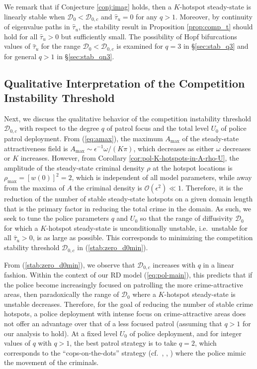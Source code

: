 \documentclass{article}%
\begin{document}
We remark that if Conjecture \ref{conj:imag} holds, then a $K$-hotspot
steady-state is linearly stable when ${\mathcal D}_0<{\mathcal
  D}_{0,c}$ and $\hat{\tau}_u=0$ for any $q>1$. Moreover, by
continuity of eigenvalue paths in $\hat{\tau}_u$, the stability result
in Proposition \ref{prop:comp_t} should hold for all $\hat{\tau}_u>0$
but sufficiently small. The possibility of Hopf bifurcations values of
$\hat{\tau}_u$ for the range ${\mathcal D}_0<{\mathcal D}_{0,c}$ is
examined for $q=3$ in \S \ref{sec:stab_q3} and for general $q>1$ in
\S \ref{sec:stab_qn3}.

\subsection{Qualitative Interpretation of the Competition Instability Threshold}\label{sec:qual_comp_d}

Next, we discuss the qualitative behavior of the competition
instability threshold ${\mathcal D}_{0,c}$ with respect to the degree
$q$ of patrol focus and the total level $U_0$ of police patrol
deployment.  From (\ref{eq:amax}), the maximum $A_{\max}$ of the
steady-state attractiveness field is $A_{\max}\sim
\epsilon^{-1}{\omega/(K\pi)}$, which decreases as either $\omega$
decreases or $K$ increases. However, from Corollary
\ref{cor:pol-K-hotspots-in-A-rho-U}, the amplitude of the steady-state
criminal density $\rho$ at the hotspot locations is
$\rho_{\max}=\left[w(0)\right]^2=2$, which is independent of all model
parameters, while away from the maxima of $A$ the criminal density is
${\mathcal O}(\epsilon^{2})\ll 1$. Therefore, it is the reduction of
the number of stable steady-state hotspots on a given domain length
that is the primary factor in reducing the total crime in the
domain. As such, we seek to tune the police parameters $q$ and $U_{0}$
so that the range of diffusivity ${\mathcal D}_{0}$ for which a
$K$-hotspot steady-state is unconditionally unstable, i.e.~unstable
for all $\hat{\tau}_u>0$, is as large as possible. This corresponds to
minimizing the competition stability threshold ${\mathcal D}_{0,c}$ in
(\ref{stab:zero_d0min}).

From (\ref{stab:zero_d0min}), we observe that ${\mathcal D}_{0,c}$
increases with $q$ in a linear fashion. Within the context of our RD
model (\ref{eq:pol-main}), this predicts that if the police become
increasingly focused on patrolling the more crime-attractive areas,
then paradoxically the range of ${\mathcal D}_{0}$ where a $K$-hotspot
steady-state is unstable decreases. Therefore, for the goal of
reducing the number of stable crime hotspots, a police deployment with
intense focus on crime-attractive areas does not offer an advantage
over that of a less focused patrol (assuming that $q>1$ for our
analysis to hold). At a fixed level $U_0$ of police deployment, and for
integer values of $q$ with $q>1$, the best patrol strategy
is to take $q=2$, which corresponds to the ``cops-on-the-dots''
strategy (cf.~\cite{jbc}, \cite{rick}, \cite{zipkin}) where the police
mimic the movement of the criminals.
\end{document}
